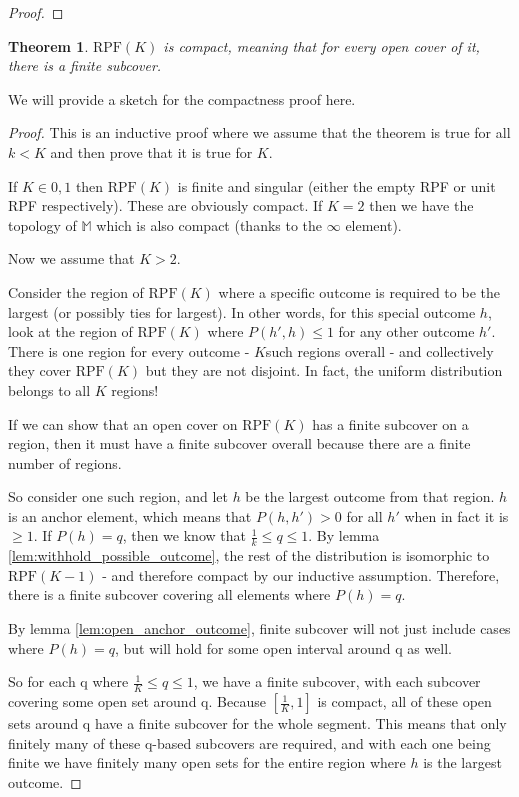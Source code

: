 \documentclass[twoside]{article}
\theoremstyle{plain}%
\newtheorem{theorem}{Theorem}[section]
\theoremstyle{definition}
\theoremstyle{remark}
\begin{document}
\begin{proof}
\end{proof}

\begin{theorem}
\(\text{RPF}(K)\) is \textit{compact}, meaning that for every open cover of it, there is a finite subcover.
\end{theorem}

We will provide a sketch for the compactness proof here.

\begin{proof}
This is an inductive proof where we assume that the theorem is true for all \(k < K\) and then prove that it is true for \(K\).

If \(K \in {0, 1}\) then \(\text{RPF}(K)\) is finite and singular (either the empty RPF or unit RPF respectively). These are obviously compact. If \(K = 2\) then we have the topology of \(\mathbb{M}\) which is also compact (thanks to the \(\infty\) element).

Now we assume that \(K > 2\).

Consider the region of \(\text{RPF}(K)\) where a specific outcome is required to be the largest (or possibly ties for largest). In other words, for this special outcome \(h\), look at the region of \(\text{RPF}(K)\) where \(P(h', h) \leq  1\) for any other outcome \(h'\). There is one region for every outcome - \(K\)such regions overall - and collectively they cover \(\text{RPF}(K)\) but they are not disjoint. In fact, the uniform distribution belongs to all \(K\) regions!

If we can show that an open cover on \(\text{RPF}(K)\) has a finite subcover on a region, then it must have a finite subcover overall because there are a finite number of regions.

So consider one such region, and let \(h\) be the largest outcome from that region. \(h\) is an anchor element, which means that \(P(h, h') > 0\) for all \(h'\) when in fact it is \(\geq 1\). If \(P(h) = q\), then we know that \(\frac{1}{k} \leq q \leq 1\). By lemma \ref{lem:withhold_possible_outcome}, the rest of the distribution is isomorphic to \(\text{RPF}(K - 1)\) - and therefore compact by our inductive assumption. Therefore, there is a finite subcover covering all elements where \(P(h) = q\).

By lemma \ref{lem:open_anchor_outcome}, finite subcover will not just include cases where \(P(h) = q\), but will hold for some open interval around q as well.

So for each q where \(\frac{1}{K} \leq q \leq 1\), we have a finite subcover, with each subcover covering some open set around q. Because \([\frac{1}{K}, 1]\) is compact, all of these open sets around q have a finite subcover for the whole segment. This means that only finitely many of these q-based subcovers are required, and with each one being finite we have finitely many open sets for the entire region where \(h\) is the largest outcome.
\end{proof}
\end{document}

